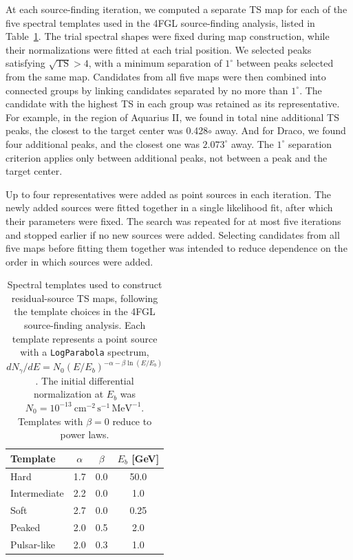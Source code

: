 \documentclass[superscriptaddress,
showpacs,preprintnumbers,nofootinbib,eqsecnum,amsmath,amssymb,aps,11pt, groupedaddress, floatfix]{revtex4-2}
\begin{document}
At each source-finding iteration, we computed a separate TS map for each of the five spectral templates used in the 4FGL source-finding analysis, listed in Table~\ref{tab:sourcefinding-templates}. 
The trial spectral shapes were fixed during map construction, while their normalizations were fitted at each trial position. 
We selected peaks satisfying $\sqrt{\mathrm{TS}}>4$, with a minimum separation of $1^\circ$ between peaks selected from the same map. 
Candidates from all five maps were then combined into connected groups by linking candidates separated by no more than $1^\circ$. 
The candidate with the highest TS in each group was retained as its representative. For example, in the region of Aquarius II, we found in total nine additional TS peaks, the closest to the target center was 0.428$\circ$ away. And for Draco, we found four additional peaks, and the closest one was $2.073^\circ$ away. The $1^\circ$ separation criterion applies only between additional peaks, not between a peak and the target center.

Up to four representatives were added as point sources in each iteration. 
The newly added sources were fitted together in a single likelihood fit, after which their parameters were fixed. 
The search was repeated for at most five iterations and stopped earlier if no new sources were added. 
Selecting candidates from all five maps before fitting them together was intended to reduce dependence on the order in which sources were added.

\begin{table}[t]
\centering
\begin{tabular}{lccc}
\hline
Template & $\alpha$ & $\beta$ & $E_b$ [GeV] \\
\hline
Hard         & 1.7 & 0.0 & 50.0 \\
Intermediate & 2.2 & 0.0 & 1.0  \\
Soft         & 2.7 & 0.0 & 0.25 \\
Peaked       & 2.0 & 0.5 & 2.0  \\
Pulsar-like  & 2.0 & 0.3 & 1.0  \\
\hline
\end{tabular}
\caption{\justifying
Spectral templates used to construct residual-source TS maps, following the template choices in the 4FGL source-finding analysis. Each template represents a point source with a \texttt{LogParabola} spectrum,
$dN_\gamma/dE=N_0(E/E_b)^{-\alpha-\beta\ln(E/E_b)}$.
The initial differential normalization at $E_b$ was
$N_0=10^{-13}~\mathrm{cm}^{-2}\,\mathrm{s}^{-1}\,\mathrm{MeV}^{-1}$.
Templates with $\beta=0$ reduce to power laws.}
\label{tab:sourcefinding-templates}
\end{table}
\end{document}
